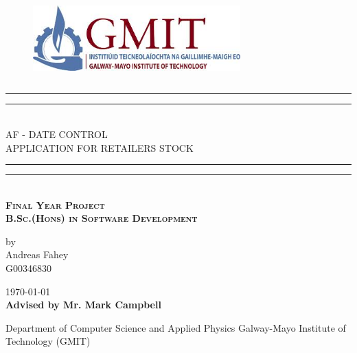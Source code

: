 \documentclass{book}
\newcommand*{\customTitle}{\begingroup %
\centering %
\vspace*{\baselineskip} %

\rule{\textwidth}{1.6pt}\vspace*{-\baselineskip}\vspace*{2pt} %
\rule{\textwidth}{0.4pt}\\[\baselineskip] %

{\Large AF - DATE CONTROL \\[2ex] APPLICATION FOR RETAILERS STOCK}\\[0.2\baselineskip] %


\rule{\textwidth}{0.4pt}\vspace*{-\baselineskip}\vspace{3.2pt} %
\rule{\textwidth}{1.6pt}\\[\baselineskip] %
\scshape %
\Large \textbf{Final Year Project}\\
\textbf{B.Sc.(Hons) in Software Development}\par %
\normalsize
\vspace*{2\baselineskip} %


{by \\ Andreas Fahey \\ G00346830 \par} %


\vspace*{2\baselineskip} %
\vfill %
{\scshape \today} \\[0.3\baselineskip] %



{\textbf{Advised by Mr. Mark Campbell}}\par %

{Department of Computer Science and Applied Physics Galway-Mayo Institute of Technology (GMIT)}\par %


\endgroup}
\begin{document}
 
\begin{figure}
\begin{center}
\includegraphics[width=8cm,height=3.3cm,keepaspectratio]{images/gmit-logo.jpg} %
\end{center}
\end{figure}
\customTitle %
\tableofcontents
\listoffigures
{} 














\end{document}
